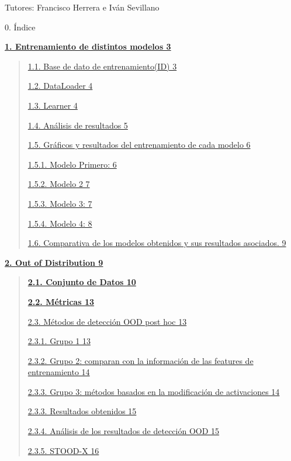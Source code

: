 Tutores: Francisco Herrera e Iván Sevillano

0. Índice

\hyperref[entrenamiento-de-distintos-modelos]{\textbf{1. Entrenamiento
de distintos modelos 3}}

\begin{quote}
\hyperref[base-de-dato-de-entrenamientoid]{1.1. Base de dato de
entrenamiento(ID) 3}

\hyperref[dataloader]{1.2. DataLoader 4}

\hyperref[learner]{1.3. Learner 4}

\hyperref[anuxe1lisis-de-resultados]{1.4. Análisis de resultados 5}

\hyperref[gruxe1ficos-y-resultados-del-entrenamiento-de-cada-modelo]{1.5.
Gráficos y resultados del entrenamiento de cada modelo 6}

\hyperref[modelo-primero]{1.5.1. Modelo Primero: 6}

\hyperref[modelo-2]{1.5.2. Modelo 2 7}

\hyperref[modelo-3]{1.5.3. Modelo 3: 7}

\hyperref[modelo-4]{1.5.4. Modelo 4: 8}

\hyperref[comparativa-de-los-modelos-obtenidos-y-sus-resultados-asociados.]{1.6.
Comparativa de los modelos obtenidos y sus resultados asociados. 9}
\end{quote}

\hyperref[out-of-distribution]{\textbf{2. Out of Distribution 9}}

\begin{quote}
\hyperref[conjunto-de-datos]{\textbf{2.1. Conjunto de Datos 10}}

\hyperref[muxe9tricas]{\textbf{2.2. Métricas 13}}

\hyperref[muxe9todos-de-detecciuxf3n-ood-post-hoc]{2.3. Métodos de
detección OOD post hoc 13}

\hyperref[grupo-1]{2.3.1. Grupo 1 13}

\hyperref[grupo-2-comparan-con-la-informaciuxf3n-de-las-features-de-entrenamiento]{2.3.2.
Grupo 2: comparan con la información de las features de entrenamiento
14}

\hyperref[grupo-3-muxe9todos-basados-en-la-modificaciuxf3n-de-activaciones]{2.3.3.
Grupo 3: métodos basados en la modificación de activaciones 14}

\hyperref[resultados-obtenidos]{2.3.3. Resultados obtenidos 15}

\hyperref[anuxe1lisis-de-los-resultados-de-detecciuxf3n-ood]{2.3.4.
Análisis de los resultados de detección OOD 15}

\hyperref[stood-x]{2.3.5. STOOD-X 16}
\end{quote}

